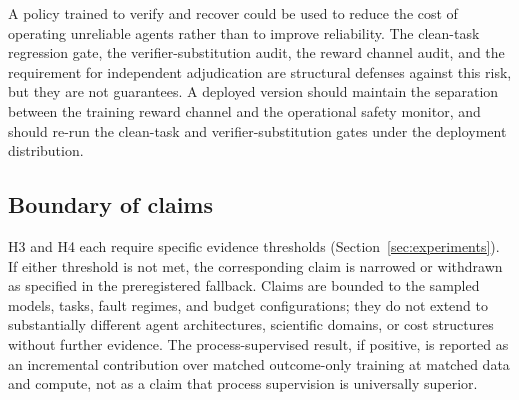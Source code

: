 A policy trained to verify and recover could be used to reduce the cost of
operating unreliable agents rather than to improve reliability. The
clean-task regression gate, the verifier-substitution audit, the reward
channel audit, and the requirement for independent adjudication are
structural defenses against this risk, but they are not guarantees. A
deployed version should maintain the separation between the training reward
channel and the operational safety monitor, and should re-run the clean-task
and verifier-substitution gates under the deployment distribution.

\subsection{Boundary of claims}

H3 and H4 each require specific evidence thresholds
(Section~\ref{sec:experiments}). If either threshold is not met, the
corresponding claim is narrowed or withdrawn as specified in the
preregistered fallback. Claims are bounded to the sampled models, tasks,
fault regimes, and budget configurations; they do not extend to
substantially different agent architectures, scientific domains, or cost
structures without further evidence. The process-supervised result, if
positive, is reported as an incremental contribution over matched
outcome-only training at matched data and compute, not as a claim that
process supervision is universally superior.
